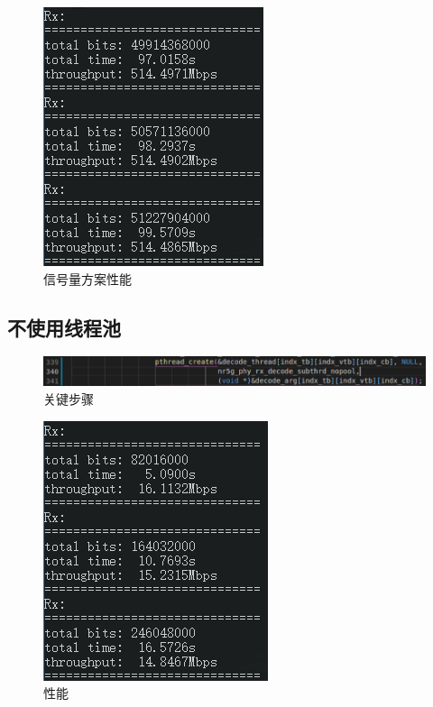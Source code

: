 \documentclass{article}
\begin{document}
\begin{figure}[H]
\begin{minipage}[t]{0.48\textwidth}
		\includegraphics[width = \textwidth]{semsta.png}
		\caption{信号量方案性能}
	\end{minipage}
\end{figure}
\subsection{不使用线程池}
\begin{figure}[H]
	\centering
	\includegraphics[width = \textwidth]{nopool0.png}
	\caption{关键步骤}
\end{figure}
\begin{figure}[H]
	\centering
	\includegraphics[width = .4\textwidth]{nopool.png}
	\caption{性能}
\end{figure}
\end{document}
